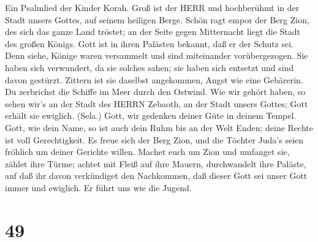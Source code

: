  Ein Psalmlied der Kinder Korah. Groß ist der HERR und
hochberühmt in der Stadt unsers Gottes, auf seinem heiligen Berge.
 Schön ragt empor der Berg Zion, des sich das ganze Land
tröstet; an der Seite gegen Mitternacht liegt die Stadt des großen
Königs.  Gott ist in ihren Palästen bekannt, daß er der
Schutz sei.  Denn siehe, Könige waren versammelt und sind
miteinander vorübergezogen.  Sie haben sich verwundert, da
sie solches sahen; sie haben sich entsetzt und sind davon gestürzt.
 Zittern ist sie daselbst angekommen, Angst wie eine
Gebärerin.  Du zerbrichst die Schiffe im Meer durch den
Ostwind.  Wie wir gehört haben, so sehen wir's an der Stadt
des HERRN Zebaoth, an der Stadt unsers Gottes; Gott erhält sie ewiglich.
(Sela.)  Gott, wir gedenken deiner Güte in deinem Tempel.
 Gott, wie dein Name, so ist auch dein Ruhm bis an der Welt
Enden; deine Rechte ist voll Gerechtigkeit.  Es freue sich
der Berg Zion, und die Töchter Juda's seien fröhlich um deiner Gerichte
willen.  Machet euch um Zion und umfanget sie, zählet ihre
Türme;  achtet mit Fleiß auf ihre Mauern, durchwandelt ihre
Paläste, auf daß ihr davon verkündiget den Nachkommen,  daß
dieser Gott sei unser Gott immer und ewiglich. Er führt uns wie die
Jugend.

\hypertarget{section-48}{%
\section{49}\label{section-48}}

